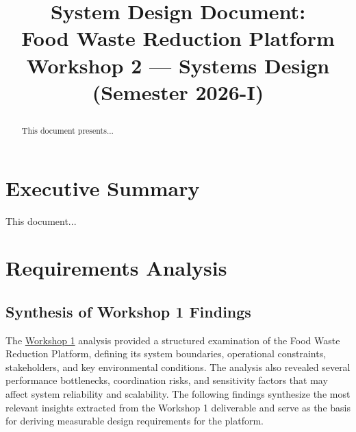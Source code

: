 \documentclass[conference]{IEEEtran}
\title{%
  \fontsize{24}{28}\selectfont\bfseries
  \parbox{0.9\textwidth}{\centering
    System Design Document:\\
    Food Waste Reduction Platform\\
    \vspace{0.2cm}
    \large Workshop 2 — Systems Design (Semester 2026-I)
  }%
}
\author{
  \IEEEauthorblockN{\textbf{Luna Alejandra Sandoval Rodriguez}}
  \IEEEauthorblockA{20241020053 \\
                    \textit{Systems Analyst / Project Lead}}
  \and
  \IEEEauthorblockN{\textbf{Cristian Camilo Bonilla Lizarazo}}
  \IEEEauthorblockA{20241020015 \\
                    \textit{Systems Analyst / Frontend Developer}}
  \linebreakand
  \IEEEauthorblockN{\textbf{Nicolas Rodriguez Granados}}
  \IEEEauthorblockA{2024102037 \\
                    \textit{Systems Analyst / Backend Developer}}
  \and
  \IEEEauthorblockN{\textbf{Juan Sebastian Bravo Rojas}}
  \IEEEauthorblockA{20241020004 \\
                    \textit{Systems Analyst / Database Specialist}}
}
\begin{document}
\maketitle

\begin{abstract}
This document presents...
\end{abstract}

\section{Executive Summary}

This document...

\section{Requirements Analysis}

\subsection{Synthesis of Workshop 1 Findings}

The \href{https://github.com/Cristian7B/SystemAnalysisCourse/blob/feature/system-architecture/Workshop_1/Workshop_1.pdf}{Workshop 1} analysis provided a structured examination of the Food Waste Reduction Platform, defining its system boundaries, operational constraints, stakeholders, and key environmental conditions. The analysis also revealed several performance bottlenecks, coordination risks, and sensitivity factors that may affect system reliability and scalability. The following findings synthesize the most relevant insights extracted from the Workshop 1 deliverable and serve as the basis for deriving measurable design requirements for the platform.
\end{document}
